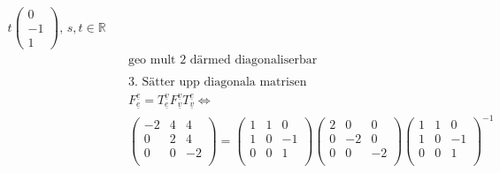 \begin{align*}
  t\begin{pmatrix} 0 \\ -1 \\ 1 \end{pmatrix}, \, s,t\in\mathbb{R} \\
  &\quad  \text{geo mult 2 därmed diagonaliserbar } \\
  &\quad  \\
  &\quad  \text{3. Sätter upp diagonala matrisen} \\
  &\quad  {F}^{\underline{e}}_{\underline{e}} =
  {T}^{\underline{v}}_{\underline{e}} {F}^{\underline{v}}_{\underline{v}} {T}^{\underline{e}}_{\underline{v}}
  \Leftrightarrow{} \\
  &\quad
  \left(\begin{array}{ccc}
   -2 & 4 & 4  \\
    0 & 2 & 4  \\
    0 & 0 & -2 \\
  \end{array}\right) =
  \left(\begin{array}{ccc}
    1 & 1 &  0  \\
    1 & 0 & -1  \\
    0 & 0 &  1  \\
  \end{array}\right)
  \left(\begin{array}{ccc}
    2 &  0 &  0  \\
    0 & -2 &  0  \\
    0 &  0 & -2 \\
  \end{array}\right)
  \left(\begin{array}{ccc}
    1 & 1 &  0 \\
    1 & 0 & -1 \\
    0 & 0 &  1 \\
  \end{array}\right)^{-1} \\
\end{align*}


